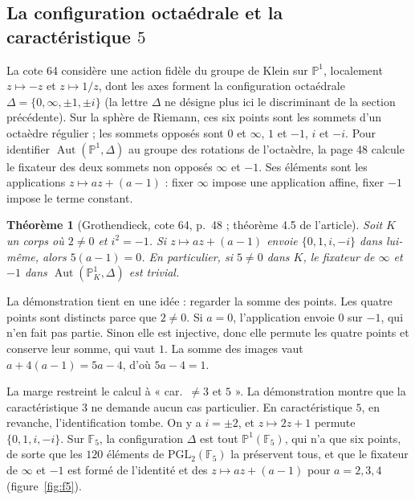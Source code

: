 \documentclass[11pt,a4paper]{amsart}
\theoremstyle{definition}
\theoremstyle{plain}
\newtheorem{theoreme}{Théorème}
\theoremstyle{remark}
\theoremstyle{plain}
\newcommand{\F}{\mathbb F}
\newcommand{\PP}{\mathbb P^1}
\newcommand{\PGL}{\mathrm{PGL}_2}
\begin{document}
\subsection{La configuration octaédrale et la caractéristique \texorpdfstring{$5$}{5}}

La cote 64 considère une action fidèle du groupe de Klein sur $\PP$, localement $z \mapsto -z$ et $z \mapsto 1/z$, dont les axes forment la configuration octaédrale $\Delta = \{0, \infty, \pm1, \pm i\}$ (la lettre $\Delta$ ne désigne plus ici le discriminant de la section précédente). Sur la sphère de Riemann, ces six points sont les sommets d'un octaèdre régulier ; les sommets opposés sont $0$ et $\infty$, $1$ et $-1$, $i$ et $-i$. Pour identifier $\operatorname{Aut}(\PP, \Delta)$ au groupe des rotations de l'octaèdre, la page 48 calcule le fixateur des deux sommets non opposés $\infty$ et $-1$. Ses éléments sont les applications $z \mapsto az + (a - 1)$ : fixer $\infty$ impose une application affine, fixer $-1$ impose le terme constant.

\begin{theoreme}[Grothendieck, cote 64, p.~48 ; théorème 4.5 de l'article]
Soit $K$ un corps où $2 \ne 0$ et $i^2 = -1$. Si $z \mapsto az + (a - 1)$ envoie $\{0, 1, i, -i\}$ dans lui-même, alors $5(a - 1) = 0$. En particulier, si $5 \ne 0$ dans $K$, le fixateur de $\infty$ et $-1$ dans $\operatorname{Aut}(\PP_K, \Delta)$ est trivial.
\end{theoreme}

La démonstration tient en une idée : regarder la somme des points. Les quatre points sont distincts parce que $2 \ne 0$. Si $a = 0$, l'application envoie $0$ sur $-1$, qui n'en fait pas partie. Sinon elle est injective, donc elle permute les quatre points et conserve leur somme, qui vaut $1$. La somme des images vaut $a + 4(a - 1) = 5a - 4$, d'où $5a - 4 = 1$.

La marge restreint le calcul à « car.~$\neq 3$ et $5$ ». La démonstration montre que la caractéristique $3$ ne demande aucun cas particulier. En caractéristique $5$, en revanche, l'identification tombe. On y a $i = \pm 2$, et $z \mapsto 2z + 1$ permute $\{0, 1, i, -i\}$. Sur $\F_5$, la configuration $\Delta$ est tout $\PP(\F_5)$, qui n'a que six points, de sorte que les $120$ éléments de $\PGL(\F_5)$ la préservent tous, et que le fixateur de $\infty$ et $-1$ est formé de l'identité et des $z \mapsto az + (a - 1)$ pour $a = 2, 3, 4$ (figure~\ref{fig:f5}).
\end{document}
